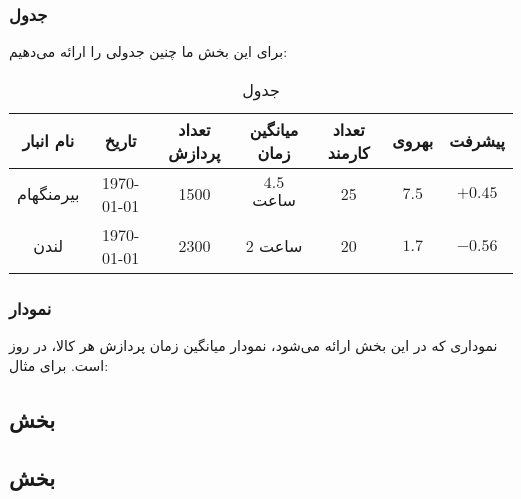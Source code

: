 \documentclass[11pt, oneside]{book}
\begin{document}
\subsubsection{جدول}
برای این بخش ما چنین جدولی را ارائه می‌دهیم:
\begin{table}[H]
\begin{center}
\caption{جدول }
\begin{adjustbox}{width=\textwidth}
\begin{tabular}{|c|c|c|c|c|c|c|}
\hline
نام انبار &
تاریخ &
تعداد پردازش &
میانگین زمان &
تعداد کارمند &
بهروی &
پیشرفت \\
\hline
\hline
بیرمنگهام &
\today &
1500 &
$4.5$ ساعت &
25 &
$7.5$ &
$+0.45$ \\
\hline
لندن &
\today &
2300 &
2 ساعت &
20 &
$1.7$ &
$-0.56$ \\
\hline
\end{tabular}
\end{adjustbox}
\end{center}
\end{table}

\newpage
\subsubsection{نمودار}
نموداری که در این بخش ارائه می‌شود، نمودار میانگین زمان پردازش هر کالا، در روز است. برای مثال:
\begin{latin}
\begin{center}
\end{center}
\end{latin}
\subsection{بخش }\label{ssec:site}

\subsection{بخش }\label{ssec:shipment}
\end{document}
